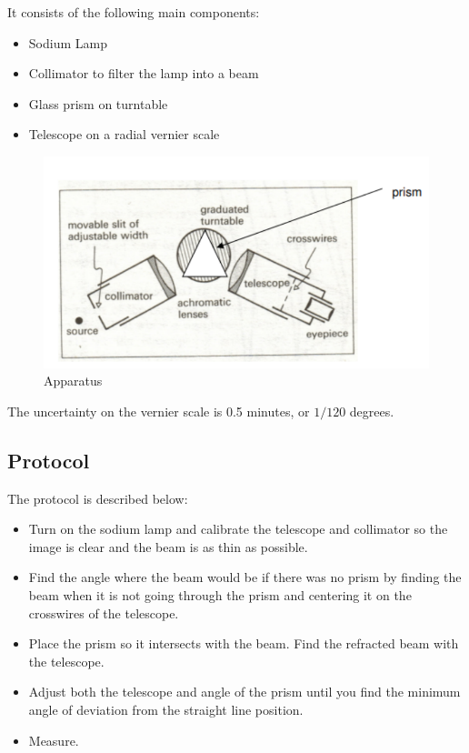 \documentclass{article}
\begin{document}
It consists of the following main components:
\begin{itemize}
  \item Sodium Lamp
  \item Collimator to filter the lamp into a beam
  \item Glass prism on turntable
  \item Telescope on a radial vernier scale
\end{itemize}

\begin{figure}[h]
  \includegraphics{./img/apparatus.pdf}
  \caption{Apparatus}
  \label{fig:apparatus}
\end{figure}

The uncertainty on the vernier scale is 0.5 minutes, or $1/120$ degrees.

\subsection{Protocol}
The protocol is described below:

\begin{itemize}
  \item Turn on the sodium lamp and calibrate the telescope and collimator so the image is clear and the beam is as thin as possible.
  \item Find the angle where the beam would be if there was no prism by finding the beam when it is not going through the prism and centering it on the crosswires of the telescope.
  \item Place the prism so it intersects with the beam. Find the refracted beam with the telescope.
  \item Adjust both the telescope and angle of the prism until you find the minimum angle of deviation from the straight line position.
  \item Measure.
\end{itemize}
\end{document}
